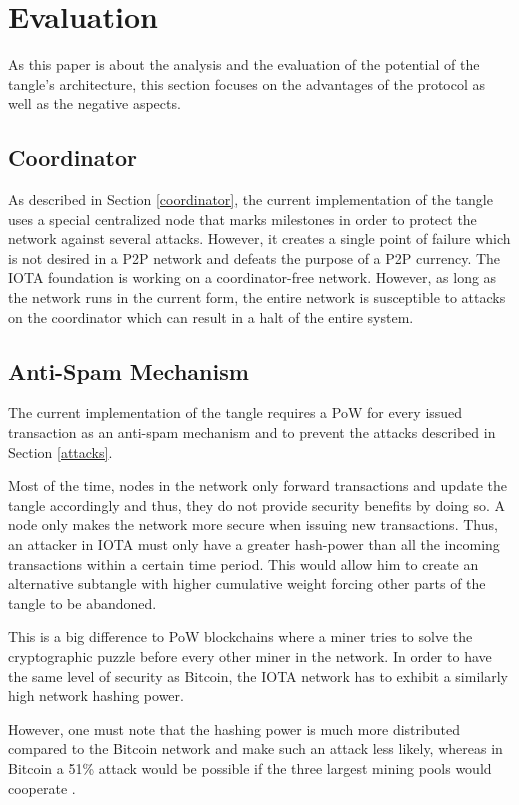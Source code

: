 \chapter{Evaluation}

As this paper is about the analysis and the evaluation of the potential of the tangle's architecture, this section focuses on the advantages of the protocol as well as the negative aspects.

\section{Coordinator}
As described in Section \ref{coordinator}, the current implementation of the tangle uses a special centralized node that marks milestones in order to protect the network against several attacks. However, it creates a single point of failure which is not desired in a P2P network and defeats the purpose of a P2P currency. The IOTA foundation is working on a coordinator-free network. However, as long as the network runs in the current form, the entire network is susceptible to attacks on the coordinator which can result in a halt of the entire system.

\section{Anti-Spam Mechanism}
The current implementation of the tangle requires a PoW for every issued transaction as an anti-spam mechanism and to prevent the attacks described in Section \ref{attacks}. 

Most of the time, nodes in the network only forward transactions and update the tangle accordingly and thus, they do not provide security benefits by doing so. A node only makes the network more secure when issuing new transactions. Thus, an attacker in IOTA must only have a greater hash-power than all the incoming transactions within a certain time period. This would allow him to create an alternative subtangle with higher cumulative weight forcing other parts of the tangle to be abandoned. 

This is a big difference to PoW blockchains where a miner tries to solve the cryptographic puzzle before every other miner in the network. In order to have the same level of security as Bitcoin, the IOTA network has to exhibit a similarly high network hashing power.

However, one must note that the hashing power is much more distributed compared to the Bitcoin network and make such an attack less likely, whereas in Bitcoin a 51\% attack would be possible if the three largest mining pools would cooperate \cite{mining-pools}. 

